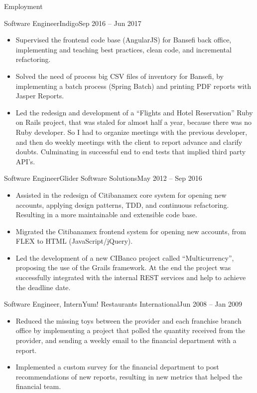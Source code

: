 \documentclass[calibri]{../macdowell-cv/mcdowellcv}
\begin{document}
\begin{cvsection}{Employment}
		\begin{cvsubsection}{Software Engineer}{Indigo}{Sep 2016 -- Jun 2017}		
			\begin{itemize}
				\item Supervised the frontend code base (AngularJS) for Bansefi back office, implementing and teaching best practices, clean code, and incremental refactoring.
				\item Solved the need of process big CSV files of inventory for Bansefi, by implementing a batch process (Spring Batch) and printing PDF reports with Jasper Reports.
			\end{itemize}
			\begin{itemize}
				\item Led the redesign and development of a ``Flights and Hotel Reservation'' Ruby on Rails project, that was staled for almost half a year, because there was no Ruby developer. So I had to organize meetings with the previous developer, and then do weekly meetings with the client to report advance and clarify doubts. Culminating in successful end to end tests that implied third party API's.
			\end{itemize}
		\end{cvsubsection}
		
		\begin{cvsubsection}{Software Engineer}{Glider Software Solutions}{May 2012 -- Sep 2016}	
			\begin{itemize}
				\item Assisted in the redesign of Citibanamex core system for opening new accounts, applying design patterns, TDD, and continuous refactoring. Resulting in a more maintainable and extensible code base.
				\item Migrated the Citibanamex frontend system for opening new accounts, from FLEX to HTML (JavaScript/jQuery).
				\item Led the development of a new CIBanco project called ``Multicurrency'', proposing the use of the Grails framework. At the end the project was successfully integrated with the internal REST services and help to achieve the deadline date.
			\end{itemize}
		\end{cvsubsection}

		\begin{cvsubsection}{Software Engineer, Intern}{Yum! Restaurants International}{Jun 2008 -- Jan 2009}
			\begin{itemize}
				\item Reduced the missing toys between the provider and each franchise branch office by implementing a project that polled the quantity received from the provider, and sending a weekly email to the financial department with a report.
				\item Implemented a custom survey for the financial department to post recommendations of new reports, resulting in new metrics that helped the financial team.
			\end{itemize}
		\end{cvsubsection}
	\end{cvsection}
	
\end{document}
